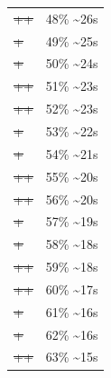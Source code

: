 \documentclass[12pt]{article}
\begin{document}
\begin{center}
\begin{tabular}{ll}
\sout{\sout{\sout{\sout{\sout{\sout{\sout{\sout{\sout{\sout{\sout{++}}}}}}}}}}} & 48\% \textasciitilde{}26s\\
\sout{\sout{\sout{\sout{\sout{\sout{\sout{\sout{\sout{\sout{\sout{\sout{+}}}}}}}}}}}} & 49\% \textasciitilde{}25s\\
\sout{\sout{\sout{\sout{\sout{\sout{\sout{\sout{\sout{\sout{\sout{\sout{+}}}}}}}}}}}} & 50\% \textasciitilde{}24s\\
\sout{\sout{\sout{\sout{\sout{\sout{\sout{\sout{\sout{\sout{\sout{\sout{++}}}}}}}}}}}} & 51\% \textasciitilde{}23s\\
\sout{\sout{\sout{\sout{\sout{\sout{\sout{\sout{\sout{\sout{\sout{\sout{++}}}}}}}}}}}} & 52\% \textasciitilde{}23s\\
\sout{\sout{\sout{\sout{\sout{\sout{\sout{\sout{\sout{\sout{\sout{\sout{\sout{+}}}}}}}}}}}}} & 53\% \textasciitilde{}22s\\
\sout{\sout{\sout{\sout{\sout{\sout{\sout{\sout{\sout{\sout{\sout{\sout{\sout{+}}}}}}}}}}}}} & 54\% \textasciitilde{}21s\\
\sout{\sout{\sout{\sout{\sout{\sout{\sout{\sout{\sout{\sout{\sout{\sout{\sout{++}}}}}}}}}}}}} & 55\% \textasciitilde{}20s\\
\sout{\sout{\sout{\sout{\sout{\sout{\sout{\sout{\sout{\sout{\sout{\sout{\sout{++}}}}}}}}}}}}} & 56\% \textasciitilde{}20s\\
\sout{\sout{\sout{\sout{\sout{\sout{\sout{\sout{\sout{\sout{\sout{\sout{\sout{\sout{+}}}}}}}}}}}}}} & 57\% \textasciitilde{}19s\\
\sout{\sout{\sout{\sout{\sout{\sout{\sout{\sout{\sout{\sout{\sout{\sout{\sout{\sout{+}}}}}}}}}}}}}} & 58\% \textasciitilde{}18s\\
\sout{\sout{\sout{\sout{\sout{\sout{\sout{\sout{\sout{\sout{\sout{\sout{\sout{\sout{++}}}}}}}}}}}}}} & 59\% \textasciitilde{}18s\\
\sout{\sout{\sout{\sout{\sout{\sout{\sout{\sout{\sout{\sout{\sout{\sout{\sout{\sout{++}}}}}}}}}}}}}} & 60\% \textasciitilde{}17s\\
\sout{\sout{\sout{\sout{\sout{\sout{\sout{\sout{\sout{\sout{\sout{\sout{\sout{\sout{\sout{+}}}}}}}}}}}}}}} & 61\% \textasciitilde{}16s\\
\sout{\sout{\sout{\sout{\sout{\sout{\sout{\sout{\sout{\sout{\sout{\sout{\sout{\sout{\sout{+}}}}}}}}}}}}}}} & 62\% \textasciitilde{}16s\\
\sout{\sout{\sout{\sout{\sout{\sout{\sout{\sout{\sout{\sout{\sout{\sout{\sout{\sout{\sout{++}}}}}}}}}}}}}}} & 63\% \textasciitilde{}15s\\

\end{tabular}
\end{center}
\end{document}
